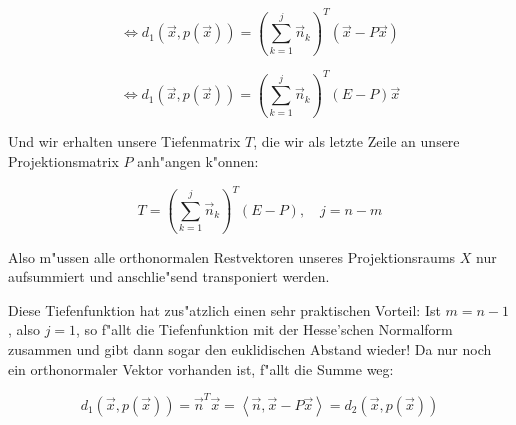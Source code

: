 \documentclass{article}
\newcommand{\lrangle}[1]{\left\langle #1 \right\rangle}
\begin{document}
    \begin{equation}
        \iff d_1(\vec{x}, p(\vec{x})) = (\sum_{k=1}^{j}{\vec{n}_k})^T (\vec{x}
        - P\vec{x})
    \end{equation}

    \begin{equation}
        \iff d_1(\vec{x}, p(\vec{x})) = (\sum_{k=1}^{j}{\vec{n}_k})^T (E - P)
        \vec{x}
    \end{equation}

Und wir erhalten unsere Tiefenmatrix \(T\), die wir als letzte Zeile an unsere
Projektionsmatrix \(P\) anh"angen k"onnen:

    \begin{equation}
        T = (\sum_{k=1}^{j}{\vec{n}_k})^T (E-P), \quad j = n - m
    \end{equation}

Also m"ussen alle orthonormalen Restvektoren unseres Projektionsraums \(X\) nur
aufsummiert und anschlie"send transponiert werden.

Diese Tiefenfunktion hat zus"atzlich einen sehr praktischen Vorteil: Ist
\(m = n - 1\), also \(j = 1\), so f"allt die Tiefenfunktion mit der Hesse'schen
Normalform zusammen und gibt dann sogar den euklidischen Abstand wieder!
Da nur noch ein orthonormaler Vektor vorhanden ist, f"allt die Summe weg:

    \begin{equation}
        d_1(\vec{x}, p(\vec{x})) = \vec{n}^T \vec{x} = \lrangle{ \vec{n},
        \vec{x} - P\vec{x}} = d_2(\vec{x}, p(\vec{x}))
    \end{equation}
\end{document}
